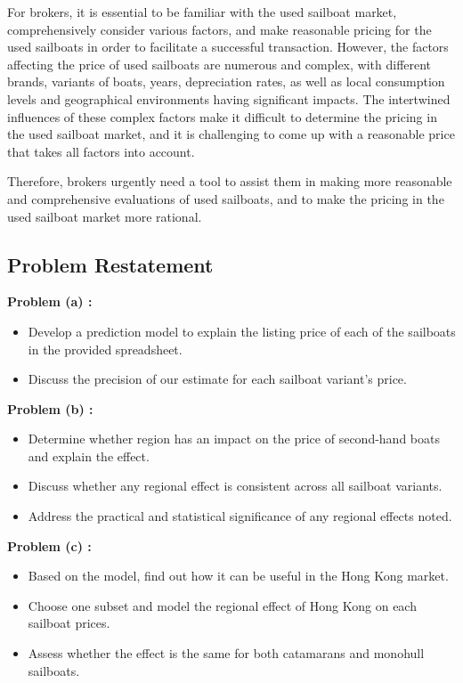 \documentclass[12pt]{article}  %
\begin{document}
For brokers, it is essential to be familiar with the used sailboat market, comprehensively consider various factors, and make reasonable pricing for the used sailboats in order to facilitate a successful transaction. However, the factors affecting the price of used sailboats are numerous and complex, with different brands, variants of boats, years, depreciation rates, as well as local consumption levels and geographical environments having significant impacts. The intertwined influences of these complex factors make it difficult to determine the pricing in the used sailboat market, and it is challenging to come up with a reasonable price that takes all factors into account.

Therefore, brokers urgently need a tool to assist them in making more reasonable and comprehensive evaluations of used sailboats, and to make the pricing in the used sailboat market more rational.
\subsection{Problem Restatement}
\textbf{Problem (a) :}
\begin{itemize}
    \item Develop a prediction model to explain the listing price of each of the sailboats in the provided spreadsheet.
    \item Discuss the precision of our estimate for each sailboat variant's price.
\end{itemize}

\textbf{Problem (b) :}
\begin{itemize}
    \item Determine whether region has an impact on the price of second-hand boats and explain the effect.
    \item Discuss whether any regional effect is consistent across all sailboat variants.
    \item Address the practical and statistical significance of any regional effects noted.
\end{itemize}

\textbf{Problem (c) :}
\begin{itemize}
    \item Based on the model, find out how it can be useful in the Hong Kong market.
    \item Choose one subset and model the regional effect of Hong Kong on each sailboat prices.
    \item Assess whether  the effect is the same for both catamarans and monohull sailboats.
\end{itemize}
\end{document}

